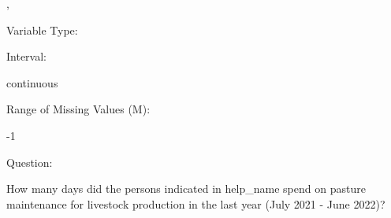 \documentclass[
]{article}
\begin{document}
,

\begin{minipage}[t]{0.3\linewidth}

\colorbox{mypink1}{}

\end{minipage}%
\begin{minipage}[t]{0.7\linewidth}

\colorbox{mypink1}{\makebox[\textwidth]{\strut\bfseries\color{black}  
 }}

\end{minipage}

\begin{minipage}[t]{0.3\linewidth}

Variable Type:

\end{minipage}%
\begin{minipage}[t]{0.7\linewidth}

\end{minipage}

\begin{minipage}[t]{0.3\linewidth}

Interval:

\end{minipage}%
\begin{minipage}[t]{0.7\linewidth}

continuous

\end{minipage}

\begin{minipage}[t]{0.3\linewidth}

Range of Missing Values (M):

\end{minipage}%
\begin{minipage}[t]{0.7\linewidth}

-1

\end{minipage}

\begin{minipage}[t]{0.3\linewidth}

Question:

\end{minipage}%
\begin{minipage}[t]{0.7\linewidth}

How many days did the persons indicated in help\_name spend on pasture
maintenance for livestock production in the last year (July 2021 - June
2022)?

\end{minipage}
\end{document}
